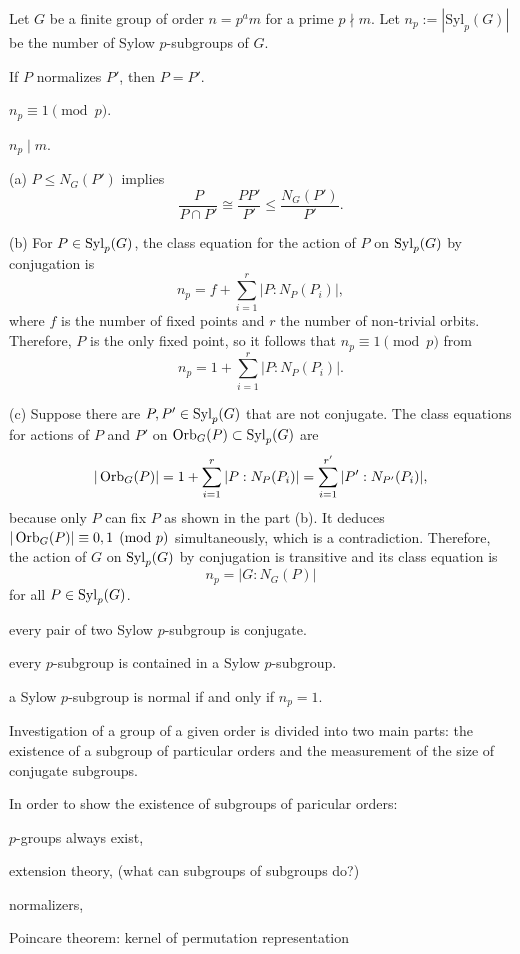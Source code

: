 \documentclass{../../large}
\begin{document}
\begin{prb}
Let $G$ be a finite group of order $n=p^am$ for a prime $p\nmid m$.
Let $n_p:=|\mathrm{Syl}_p(G)|$ be the number of Sylow $p$-subgroups of $G$.
\begin{parts}
\item If $P$ normalizes $P'$, then $P=P'$.
\item $n_p\equiv1\pmod p$.
\item $n_p\mid m$.
\end{parts}
\end{prb}
\begin{pf}
(a)
$P\le N_G(P')$ implies
\[\frac P{P\cap P'}\cong\frac{PP'}{P'}\le\frac{N_G(P')}{P'}.\]


(b)
For $P\in\operatorname{Syl}_p(G)$, the class equation for the action of $P$ on $\operatorname{Syl}_p(G)$ by conjugation is
\[n_p=f+\sum_{i=1}^r|P:N_P(P_i)|,\]
where $f$ is the number of fixed points and $r$ the number of non-trivial orbits.
Therefore, $P$ is the only fixed point, so it follows that $n_p\equiv1\pmod p$ from
\[n_p=1+\sum_{i=1}^r|P:N_P(P_i)|.\]

(c)
Suppose there are $P,P'\in\operatorname{Syl}_p(G)$ that are not conjugate.
The class equations for actions of $P$ and $P'$ on $\operatorname{Orb}_G(P)\subset\operatorname{Syl}_p(G)$ are
\[|\operatorname{Orb}_G(P)|=1+\sum_{i=1}^r|P:N_P(P_i)|=\sum_{i=1}^{r'}|P':N_{P'}(P_i)|,\]
because only $P$ can fix $P$ as shown in the part (b).
It deduces $|\operatorname{Orb}_G(P)|\equiv0,1\pmod{p}$ simultaneously, which is a contradiction.
Therefore, the action of $G$ on $\operatorname{Syl}_p(G)$ by conjugation is transitive and its class equation is
\[n_p=|G:N_G(P)|\]
for all $P\in\operatorname{Syl}_p(G)$.
\end{pf}

\begin{parts}
\item every pair of two Sylow $p$-subgroup is conjugate.
\item every $p$-subgroup is contained in a Sylow $p$-subgroup.
\item a Sylow $p$-subgroup is normal if and only if $n_p=1$.
\end{parts}

Investigation of a group of a given order is divided into two main parts: the existence of a subgroup of particular orders and the measurement of the size of conjugate subgroups.

In order to show the existence of subgroups of paricular orders:
\begin{parts}
\item $p$-groups always exist,
\item extension theory, (what can subgroups of subgroups do?)
\item normalizers,
\item Poincare theorem: kernel of permutation representation
\end{parts}
\end{document}
